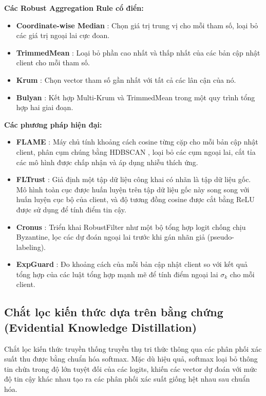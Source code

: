 \textbf{Các Robust Aggregation Rule cổ điển:}
\begin{itemize}
    \item \textbf{Coordinate-wise Median} \cite{yin2018fedcomed}: Chọn giá trị trung vị cho mỗi tham số, loại bỏ các giá trị ngoại lai cực đoan.
    \item \textbf{TrimmedMean} \cite{yin2018fedcomed}: Loại bỏ phần cao nhất và thấp nhất của các bản cập nhật client cho mỗi tham số.
    \item \textbf{Krum} \cite{blanchard2017krum}: Chọn vector tham số gần nhất với tất cả các lân cận của nó.
    \item \textbf{Bulyan} \cite{guerraoui2018bulyan}: Kết hợp Multi-Krum và TrimmedMean trong một quy trình tổng hợp hai giai đoạn.
\end{itemize}

\textbf{Các phương pháp hiện đại:}
\begin{itemize}
    \item \textbf{FLAME} \cite{nguyen2022flame}: Máy chủ tính khoảng cách cosine từng cặp cho mỗi bản cập nhật client, phân cụm chúng bằng HDBSCAN \cite{mcinnes2017hdbscan}, loại bỏ các cụm ngoại lai, cắt tỉa các mô hình được chấp nhận và áp dụng nhiễu thích ứng.
    \item \textbf{FLTrust} \cite{cao2020fltrust}: Giả định một tập dữ liệu công khai có nhãn là tập dữ liệu gốc. Mô hình toàn cục được huấn luyện trên tập dữ liệu gốc này song song với huấn luyện cục bộ của client, và độ tương đồng cosine được cắt bằng ReLU được sử dụng để tính điểm tin cậy.
    \item \textbf{Cronus} \cite{chang2019cronus}: Triển khai RobustFilter như một bộ tổng hợp logit chống chịu Byzantine, lọc các dự đoán ngoại lai trước khi gán nhãn giả (pseudo-labeling).
    \item \textbf{ExpGuard} \cite{roux2025byzantine}: Đo khoảng cách của mỗi bản cập nhật client so với kết quả tổng hợp của các luật tổng hợp mạnh mẽ để tính điểm ngoại lai $\sigma_k$ cho mỗi client.
\end{itemize}

\subsection{Chắt lọc kiến thức dựa trên bằng chứng (Evidential Knowledge Distillation)}
\label{sec:ekd}

Chắt lọc kiến thức truyền thống truyền thụ tri thức thông qua các phân phối xác suất thu được bằng chuẩn hóa softmax. Mặc dù hiệu quả, softmax loại bỏ thông tin chứa trong độ lớn tuyệt đối của các logits, khiến các vector dự đoán với mức độ tin cậy khác nhau tạo ra các phân phối xác suất giống hệt nhau sau chuẩn hóa.

